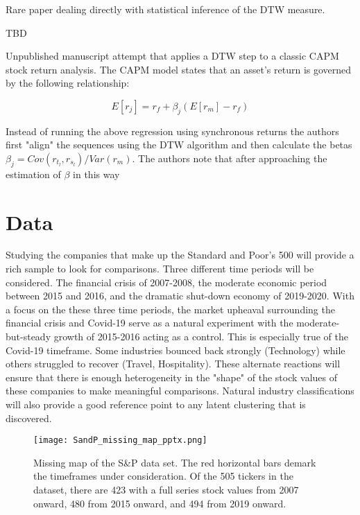 \documentclass[12pt]{article}
\begin{document}
\parencite{DuyTakeuchi2023statistical} Rare paper dealing directly with statistical inference of the DTW measure.

\parencite{WangXieHanSun2012} TBD

\parencite{HowardTalisAlexeev_2020} Unpublished manuscript attempt that applies a DTW step to a classic CAPM stock return analysis. The CAPM model states that an asset's return is governed by the following relationship:

\begin{equation}
    E[r_{j}] = r_{f} + \beta_{j} (E[r_{m}] - r_{f})
\end{equation}

Instead of running the above regression using  synchronous returns the authors first "align" the sequences using the DTW algorithm and then calculate the betas $\beta_{j} = Cov(r_{t_{l}}, r_{s_{l}}) / Var(r_{m})$. The authors note that after approaching the estimation of $\beta$ in this way

\section{Data}

Studying the companies that make up the Standard and Poor's 500 will provide a rich sample to look for comparisons. Three different time periods will be considered. The financial crisis of 2007-2008, the moderate economic period between 2015 and 2016, and the dramatic shut-down economy of 2019-2020. With a focus on the these three time periods, the market upheaval surrounding the financial crisis and Covid-19 serve as a natural experiment with the moderate-but-steady growth of 2015-2016 acting as a control. This is especially true of the Covid-19 timeframe. Some industries bounced back strongly (Technology) while others struggled to recover (Travel, Hospitality). These alternate reactions will ensure that there is enough heterogeneity in the "shape" of the stock values of these companies to make meaningful comparisons. Natural industry classifications will also provide a good reference point to any latent clustering that is discovered.

\begin{figure}
    \centering
    \texttt{[image: SandP\_missing\_map\_pptx.png]}
    \caption{Missing map of the S\&P data set. The red horizontal bars demark the timeframes under consideration. Of the 505 tickers in the dataset, there are 423 with a full series stock values from 2007 onward, 480 from 2015 onward, and 494 from 2019 onward.}
    \label{fig:SandP_missing_map}
\end{figure}
\end{document}
